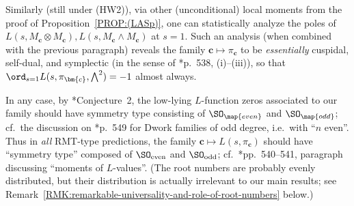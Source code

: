 \documentclass[12pt]{report}
\begin{document}
Similarly (still under (HW2)),
via other (unconditional) local moments from the proof of Proposition~\ref{PROP:(LASp)},
one can statistically analyze the poles of $L(s,M_{\bm{c}}\otimes M_{\bm{c}}),L(s,M_{\bm{c}}\wedge M_{\bm{c}})$ at $s=1$.
Such an analysis
(when combined with the previous paragraph)
reveals the family $\bm{c}\mapsto\pi_{\bm{c}}$ to be \emph{essentially}
cuspidal, self-dual, and symplectic
(in the sense of \cite{sarnak2016families}*{p.~538, (i)--(iii)}),
so that $\ord_{s=1}L(s,\pi_{\bm{c}},\bigwedge^2)=-1$ almost always.


In any case, by \cite{sarnak2016families}*{Conjecture~2},
the low-lying $L$-function zeros associated to our family
should have symmetry type
consisting of
$\SO_{\map{even}}$ and $\SO_{\map{odd}}$;
cf.~the discussion on \cite{sarnak2016families}*{p.~549}
for Dwork families of odd degree,
i.e.~with ``$n$ even''.
% 
Thus in \emph{all} RMT-type predictions,
the family $\bm{c}\mapsto L(s,\pi_{\bm{c}})$ should have ``symmetry type'' composed of
$\SO_{\textnormal{even}}$ and $\SO_{\textnormal{odd}}$;
cf.~\cite{sarnak2016families}*{pp.~540--541, paragraph discussing ``moments of $L$-values''}.
(The root numbers are probably evenly distributed, but their distribution is actually irrelevant to our main results; see Remark~\ref{RMK:remarkable-universality-and-role-of-root-numbers} below.)
\end{document}
